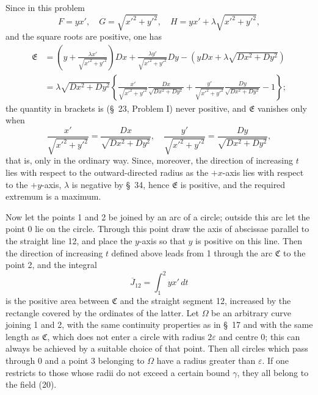 \documentclass[11pt,a4paper,leqno]{article}
\begin{document}
Since in this problem
\[
F=yx',\quad G=\sqrt{x'^2+y'^2},\quad H=yx'+\lambda\sqrt{x'^2+y'^2},
\]
and the square roots are positive, one has
\[
\begin{aligned}
\mathfrak{E}&=\left(y+\frac{\lambda x'}{\sqrt{x'^2+y'^2}}\right)Dx+
\frac{\lambda y'}{\sqrt{x'^2+y'^2}}Dy-
\left(yDx+\lambda\sqrt{Dx^2+Dy^2}\right)\\
&=\lambda\sqrt{Dx^2+Dy^2}\left\{\frac{x'}{\sqrt{x'^2+y'^2}}\frac{Dx}{\sqrt{Dx^2+Dy^2}}+
\frac{y'}{\sqrt{x'^2+y'^2}}\frac{Dy}{\sqrt{Dx^2+Dy^2}}-1\right\};
\end{aligned}
\]
the quantity in brackets is (\S~23, Problem I) never positive, and $\mathfrak{E}$ vanishes only when
\[
\frac{x'}{\sqrt{x'^2+y'^2}}=\frac{Dx}{\sqrt{Dx^2+Dy^2}},\quad
\frac{y'}{\sqrt{x'^2+y'^2}}=\frac{Dy}{\sqrt{Dx^2+Dy^2}},
\]
that is, only in the ordinary way. Since, moreover, the direction of increasing $t$ lies with respect to the outward-directed radius as the
$+x$-axis lies with respect to the $+y$-axis, $\lambda$ is negative by \S~34, hence $\mathfrak{E}$ is positive, and the required extremum is a maximum.

Now let the points 1 and 2 be joined by an arc of a circle; outside this arc let the point 0 lie on the circle. Through this point draw the axis of abscissae parallel to the straight line 12, and place the $y$-axis so that $y$ is positive on this line. Then the direction of increasing $t$ defined above leads from 1 through the arc $\mathfrak{C}$ to the point 2, and the integral
\[
\overline{J}_{12}=\int_1^2 yx'\,dt
\]
is the positive area between $\mathfrak{C}$ and the straight segment 12, increased by the rectangle covered by the ordinates of the latter. Let $\Omega$ be an arbitrary curve joining 1 and 2, with the same continuity properties as in \S~17 and with the same length as $\mathfrak{C}$, which does not enter a circle with radius $2\varepsilon$ and centre 0; this can always be achieved by a suitable choice of that point. Then all circles which pass through 0 and a point 3 belonging to $\Omega$ have a radius greater than $\varepsilon$. If one restricts to those whose radii do not exceed a certain bound $\gamma$, they all belong to the field (20).
\end{document}
